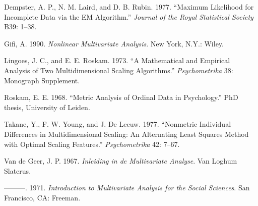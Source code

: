 \documentclass[
  12pt,
]{book}
\newlength{\cslhangindent}
\newenvironment{CSLReferences}[2] %
 {\begin{list}{}{%
  \setlength{\itemindent}{0pt}
  \setlength{\leftmargin}{0pt}
  \setlength{\parsep}{0pt}
  \ifodd #1
   \setlength{\leftmargin}{\cslhangindent}
   \setlength{\itemindent}{-1\cslhangindent}
  \fi
  \setlength{\itemsep}{#2\baselineskip}}}
 {\end{list}}
\begin{document}
\begin{CSLReferences}{1}{0}
Dempster, A. P., N. M. Laird, and D. B. Rubin. 1977. {``{Maximum Likelihood for Incomplete Data via the EM Algorithm}.''} \emph{Journal of the Royal Statistical Society} B39: 1--38.

Gifi, A. 1990. \emph{Nonlinear Multivariate Analysis}. New York, N.Y.: Wiley.

Lingoes, J. C., and E. E. Roskam. 1973. {``{A Mathematical and Empirical Analysis of Two Multidimensional Scaling Algorithms}.''} \emph{Psychometrika} 38: Monograph Supplement.

Roskam, E. E. 1968. {``{Metric Analysis of Ordinal Data in Psychology}.''} PhD thesis, University of Leiden.

Takane, Y., F. W. Young, and J. De Leeuw. 1977. {``Nonmetric Individual Differences in Multidimensional Scaling: An Alternating Least Squares Method with Optimal Scaling Features.''} \emph{Psychometrika} 42: 7--67.

Van de Geer, J. P. 1967. \emph{{Inleiding in de Multivariate Analyse}}. Van Loghum Slaterus.

---------. 1971. \emph{{Introduction to Multivariate Analysis for the Social Sciences}}. San Francisco, CA: Freeman.

\end{CSLReferences}
\end{document}
